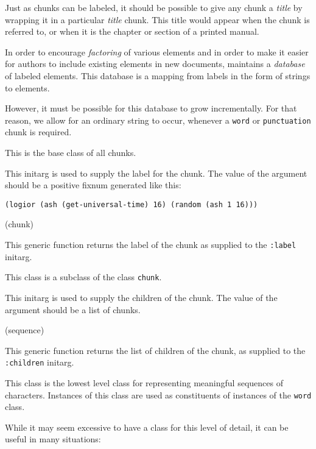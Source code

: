 Just as chunks can be labeled, it should be possible to give any chunk
a \emph{title} by wrapping it in a particular \emph{title} chunk.
This title would appear when the chunk is referred to, or when it is
the chapter or section of a printed manual.

In order to encourage \emph{factoring} of various elements and in
order to make it easier for authors to include existing elements in
new documents, \sysname{} maintains a \emph{database} of labeled
elements.  This database is a mapping from labels in the form of
\commonlisp{} strings to elements.

However, it must be possible for this database to grow incrementally.
For that reason, we allow for an ordinary string to occur, whenever a
\texttt{word} or \texttt{punctuation} chunk is required.


This is the base class of all chunks.


This initarg is used to supply the label for the chunk.  The value of
the argument should be a positive fixnum generated like this:

\begin{verbatim}
(logior (ash (get-universal-time) 16) (random (ash 1 16)))
\end{verbatim}

 {(chunk)}

This generic function returns the label of the chunk as supplied to
the \texttt{:label} initarg. 


This class is a subclass of the class \texttt{chunk}.


This initarg is used to supply the children of the chunk.  The value
of the argument should be a list of chunks.

 {(sequence)}

This generic function returns the list of children of the chunk, as
supplied to the \texttt{:children} initarg.


This class is the lowest level class for representing meaningful
sequences of characters.  Instances of this class are used as
constituents of instances of the \texttt{word} class.

While it may seem excessive to have a class for this level of detail,
it can be useful in many situations:

